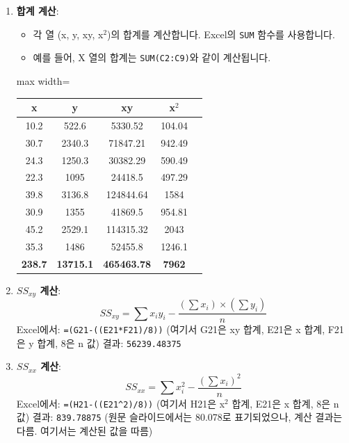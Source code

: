 \documentclass[11pt,a4paper]{article}
\theoremstyle{definition}
\begin{document}
\begin{tcolorbox}[examplebox, title=Excel 실습: 인구 및 매출 데이터]
\begin{enumerate}[label=\arabic*.]
    \item \textbf{합계 계산}:
    \begin{itemize}
        \item 각 열 (x, y, xy, x$^2$)의 합계를 계산합니다. Excel의 \texttt{SUM} 함수를 사용합니다.
        \item 예를 들어, X 열의 합계는 \texttt{SUM(C2:C9)}와 같이 계산됩니다.
    \end{itemize}
    \begin{adjustbox}{max width=\textwidth}
    \begin{tabular}{ccccc}
    \toprule
    \textbf{x} & \textbf{y} & \textbf{xy} & \textbf{x$^2$} \\
    \midrule
    10.2 & 522.6 & 5330.52 & 104.04 \\
    30.7 & 2340.3 & 71847.21 & 942.49 \\
    24.3 & 1250.3 & 30382.29 & 590.49 \\
    22.3 & 1095 & 24418.5 & 497.29 \\
    39.8 & 3136.8 & 124844.64 & 1584 \\
    30.9 & 1355 & 41869.5 & 954.81 \\
    45.2 & 2529.1 & 114315.32 & 2043 \\
    35.3 & 1486 & 52455.8 & 1246.1 \\
    \midrule
    \textbf{238.7} & \textbf{13715.1} & \textbf{465463.78} & \textbf{7962} \\
    \bottomrule
    \end{tabular}
    \end{adjustbox}

    \item \textbf{$SS_{xy}$ 계산}:
    \begin{equation*}
    SS_{xy} = \sum x_iy_i - \frac{(\sum x_i) \times (\sum y_i)}{n}
    \end{equation*}
    Excel에서: \texttt{=(G21-((E21*F21)/8))} (여기서 G21은 xy 합계, E21은 x 합계, F21은 y 합계, 8은 n 값)
    결과: \texttt{56239.48375}

    \item \textbf{$SS_{xx}$ 계산}:
    \begin{equation*}
    SS_{xx} = \sum x_i^2 - \frac{(\sum x_i)^2}{n}
    \end{equation*}
    Excel에서: \texttt{=(H21-((E21^2)/8))} (여기서 H21은 x$^2$ 합계, E21은 x 합계, 8은 n 값)
    결과: \texttt{839.78875} (원문 슬라이드에서는 80.078로 표기되었으나, 계산 결과는 다름. 여기서는 계산된 값을 따름)


\end{enumerate}
\end{tcolorbox}
\end{document}
